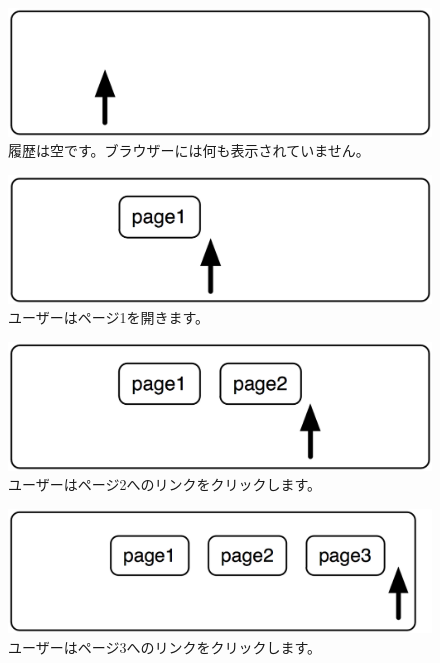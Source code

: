 \documentclass[a4paper,10pt,twoside]{book}
\begin{document}
\begin{figure}[!ht]
\centerline{\includegraphics[scale=0.5]{emptyStef}}
\caption{履歴は空です。ブラウザーには何も表示されていません。}
\vspace{.2in}
\end{figure}

\begin{figure}[!ht]
\centerline{\includegraphics[scale=0.5]{page1Stef}}
\caption{ユーザーはページ1を開きます。}
\vspace{.2in}
\end{figure}

\begin{figure}[!ht]
\centerline{\includegraphics[scale=0.5]{page2Stef}}
\caption{ユーザーはページ2へのリンクをクリックします。}
\vspace{.2in}
\end{figure}

\begin{figure}[!ht]
\centerline{\includegraphics[scale=0.5]{page3Stef}}
\caption{ユーザーはページ3へのリンクをクリックします。}
\vspace{.2in}
\end{figure}
\end{document}
